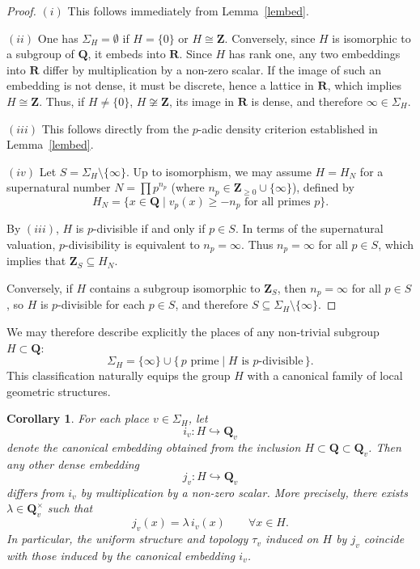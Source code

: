 \documentclass[11pt,a4paper]{article}
\newtheorem{corollary}[theorem]{Corollary}
\newcommand{\Q}{\mathbf{Q}}
\newcommand{\R}{\mathbf{R}}
\newcommand{\Z}{\mathbf{Z}}
\begin{document}
\begin{proof}
$(i)$ This follows immediately from 
Lemma~\ref{lembed}.

$(ii)$ One has  $\Sigma_H=\emptyset$ if $H=\{0\}$ or 
    $H\cong\Z$. Conversely, since $H$ is isomorphic to a subgroup 
of $\Q$, it embeds into $\R$. 
Since $H$ has rank one, any two embeddings into 
$\R$ differ by multiplication by a non-zero scalar. 
If the image of such an embedding is not dense, 
it must be discrete, hence a lattice in $\R$, 
which implies $H \cong \Z$. 
Thus, if $H\neq\{0\}$, $H \not\cong \Z$, 
its image in $\R$ is dense, 
and therefore $\infty \in \Sigma_H$.

$(iii)$ This follows directly from the 
$p$-adic density criterion established 
in Lemma~\ref{lembed}.

$(iv)$ Let 
$S = \Sigma_H \setminus \{\infty\}$. 
Up to isomorphism, we may assume 
$H = H_N$ for a supernatural number 
$N = \prod p^{n_p}$ 
(where $n_p \in \Z_{\ge 0} \cup \{\infty\}$), 
defined by
\[
H_N 
= \{ x \in \Q 
\mid v_p(x) \ge -n_p 
\text{ for all primes } p \}.
\]

By $(iii)$, $H$ is $p$-divisible 
if and only if $p \in S$. 
In terms of the supernatural valuation, 
$p$-divisibility is equivalent to 
$n_p = \infty$. 
Thus $n_p=\infty$ for all $p \in S$, 
which implies that 
$\Z_S \subseteq H_N$. 

Conversely, if $H$ contains a subgroup 
isomorphic to $\Z_S$, then 
$n_p=\infty$ for all $p \in S$, 
so $H$ is $p$-divisible for each 
$p \in S$, and therefore 
$S \subseteq \Sigma_H \setminus \{\infty\}$.
\end{proof}

We may therefore describe explicitly the places of any 
non-trivial subgroup $H\subset\Q$:
\[
\Sigma_H
=
\{\infty\}
\cup
\{\,p \text{ prime}\mid H \text{ is } p\text{-divisible}\,\}.
\]
This classification naturally equips the group $H$
with a canonical family of local geometric structures.

\begin{corollary}
For each place $v\in\Sigma_H$, let
\[
i_v:H\hookrightarrow\Q_v
\]
denote the canonical embedding obtained from the inclusion
$
H\subset\Q\subset\Q_v$. 
Then any other dense embedding
\[
j_v:H\hookrightarrow\Q_v
\]
differs from $i_v$ by multiplication by a non-zero scalar. More precisely, there exists
$
\lambda\in\Q_v^\times
$
such that
\[
j_v(x)=\lambda\, i_v(x)
\qquad
\forall x\in H.
\]
In particular, the uniform structure and topology $\tau_v$ induced on $H$ by $j_v$ coincide with those induced by the canonical embedding $i_v$.
\end{corollary}
\end{document}
